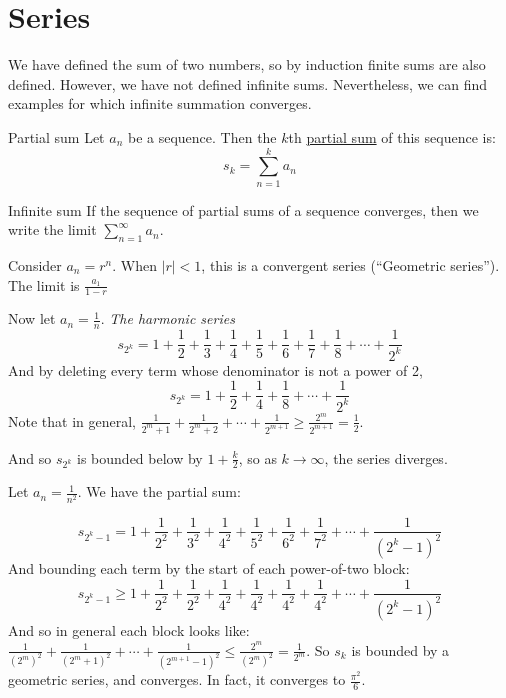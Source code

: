 \documentclass[../Main.tex]{subfiles}
\begin{document}
\section{Series}
We have defined the sum of two numbers, so by induction finite sums are also defined. However, we have not defined infinite sums. Nevertheless, we can find examples for which infinite summation converges.\par
\begin{definition}{Partial sum}
    Let $a_n$ be a sequence. Then the $k$th \underline{partial sum} of this sequence is:
    \begin{equation*}
        s_k = \sum_{n=1}^{k} a_n
    \end{equation*}
\end{definition}
\begin{definition}{Infinite sum}
    If the sequence of partial sums of a sequence converges, then we write the limit $\sum_{n=1}^{\infty} a_n$.
\end{definition}
\begin{examples}
    \item Consider $a_n = r^n$. When $|r| < 1$, this is a convergent series (``Geometric series''). The limit is $\frac{a_1}{1-r}$
    \item Now let $a_n = \frac{1}{n}$. \textit{The harmonic series}
        \begin{equation*}
            s_{2^k} = 1 + \frac{1}{2} + \frac{1}{3} + \frac{1}{4} + \frac{1}{5} + \frac{1}{6} + \frac{1}{7} + \frac{1}{8} + \cdots + \frac{1}{2^k}
        \end{equation*}
        And by deleting every term whose denominator is not a power of 2,
        \begin{equation*}
            s_{2^k} = 1 + \frac{1}{2} + \frac{1}{4} + \frac{1}{8} + \cdots + \frac{1}{2^k}
        \end{equation*}
        Note that in general, $\frac{1}{2^m + 1} + \frac{1}{2^m + 2} + \cdots + \frac{1}{2^{m+1}} \geq \frac{2^m}{2^{m+1}} = \frac{1}{2}$.\par
        And so $s_{2^k}$ is bounded below by $1 + \frac{k}{2}$, so as $k \rightarrow \infty$, the series diverges.
    \item Let $a_n = \frac{1}{n^2}$. We have the partial sum:\par
        \begin{equation*}
            s_{2^k - 1} = 1 + \frac{1}{2^2} + \frac{1}{3^2} + \frac{1}{4^2} + \frac{1}{5^2} + \frac{1}{6^2} + \frac{1}{7^2} + \cdots + \frac{1}{(2^k - 1)^2}
        \end{equation*}
        And bounding each term by the start of each power-of-two block:
        \begin{equation*}
            s_{2^k - 1} \geq 1 + \frac{1}{2^2} + \frac{1}{2^2} + \frac{1}{4^2} + \frac{1}{4^2} + \frac{1}{4^2} + \frac{1}{4^2} + \cdots + \frac{1}{(2^k - 1)^2}
        \end{equation*}
        And so in general each block looks like: $\frac{1}{(2^m)^2} + \frac{1}{(2^m + 1)^2} + \cdots + \frac{1}{(2^{m + 1} - 1)^2} \leq \frac{2^m}{(2^m)^2} = \frac{1}{2^m}$.
        So $s_k$ is bounded by a geometric series, and converges. In fact, it converges to $\frac{\pi^2}{6}$.
\end{examples}
\end{document}
